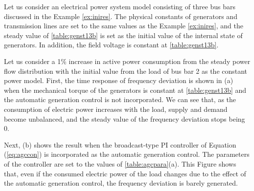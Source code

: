 \documentclass[graybox, envcountchap]{svmult}
\begin{document}
\begin{例}\label{ex:agcdemo}
Let us consider an electrical power system model consisting of three bus bars discussed in the Example \ref{ex:inires}.
The physical constants of generators and transmission lines are set to the same values as the Example \ref{ex:inires}, and the steady value of \ref{table:genst13b} is set as the initial value of the internal state of generators.
In addition, the field voltage is constant at \ref{table:genst13b}.

Let us consider a 1\% increase in active power consumption from the steady power flow distribution with the initial value from the load of bus bar 2 as the constant power model.
First, the time response of frequency deviation is shown in (a) when the mechanical torque of the generators is constant at \ref{table:genst13b} and the automatic generation control is not incorporated.
We can see that, as the consumption of electric power increases with the load, supply and demand become unbalanced, and the steady value of the frequency deviation stops being 0.

Next, (b) shows the result when the broadcast-type PI controller of Equation (\ref{eq:agccon}) is incorporated as the automatic generation control.
The parameters of the controller are set to the values of \ref{table:agcpara}(a).
This Figure shows that, even if the consumed electric power of the load changes due to the effect of the automatic generation control, the frequency deviation is barely generated.
\end{例}
\end{document}
